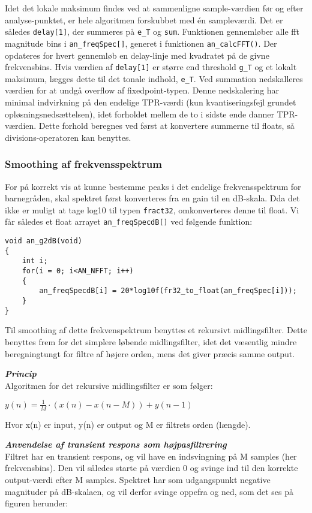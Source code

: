 Idet det lokale maksimum findes ved at sammenligne sample-værdien før og efter analyse-punktet, er hele algoritmen forskubbet med én sampleværdi. Det er således \verb+delay[1]+, der summeres på \verb+e_T+ og \verb+sum+. Funktionen gennemløber alle fft magnitude bins i \verb+an_freqSpec[]+, generet i funktionen \verb+an_calcFFT()+. Der opdateres for hvert gennemløb en delay-linje med kvadratet på de givne frekvensbins. Hvis værdien af \verb+delay[1]+ er større end threshold \verb+g_T+ og et lokalt maksimum, lægges dette til det tonale indhold, \verb+e_T+. Ved summation nedskalleres værdien for at undgå overflow af fixedpoint-typen. Denne nedskalering har minimal indvirkning på den endelige TPR-værdi (kun kvantiseringsfejl grundet opløsningsnedsættelsen), idet forholdet mellem de to i sidste ende danner TPR-værdien. Dette forhold beregnes ved først at konvertere summerne til floats, så divisions-operatoren kan benyttes.

\subsubsection{Smoothing af frekvensspektrum}
For på korrekt vis at kunne bestemme peaks i det endelige frekvensspektrum for barnegråden, skal spektret først konverteres fra en gain til en dB-skala. Dda det ikke er muligt at tage log10 til typen \verb+fract32+, omkonverteres denne til float. Vi får således et float arrayet \verb+an_freqSpecdB[]+ ved følgende funktion:
\begin{verbatim}void an_g2dB(void)
{
    int i;
    for(i = 0; i<AN_NFFT; i++)
    {
        an_freqSpecdB[i] = 20*log10f(fr32_to_float(an_freqSpec[i]));
    }
}\end{verbatim}

Til smoothing af dette frekvenspektrum benyttes et rekursivt midlingsfilter. Dette benyttes frem for det simplere løbende midlingsfilter, idet det væsentlig mindre beregningtungt for filtre af højere orden, mens det giver præcis samme output.

\textbf{\textit{Princip}} \\
Algoritmen for det rekursive midlingsfilter er som følger:
\begin{center}
$y\left( n \right) =\frac { 1 }{ M } \cdot \left( x\left( n \right) -x\left( n-M \right)  \right) +y\left( n-1 \right) $
\end{center}
Hvor x(n) er input, y(n) er output og M er filtrets orden (længde).

\textbf{\textit{Anvendelse af transient respons som højpasfiltrering}}\\ \label{intlyd:analyzer:smooth_hp} 
Filtret har en transient respons, og vil have en indsvingning på M samples (her frekvensbins). Den vil således starte på værdien 0 og svinge ind til den korrekte output-værdi efter M samples. Spektret har som udgangspunkt negative magnituder på dB-skalaen, og vil derfor svinge oppefra og ned, som det ses på figuren herunder:

